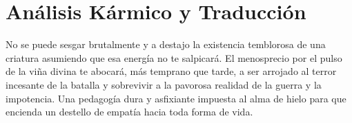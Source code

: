 \section{Análisis Kármico y Traducción}
\begin{figure}
  \vspace{-1.5em}
  \begin{center}
  \end{center}
  \vspace{-1.5em}
\end{figure}
No se puede sesgar brutalmente y a destajo la existencia temblorosa de una criatura asumiendo que esa energía no te salpicará. El menosprecio por el pulso de la viña divina te abocará, más temprano que tarde, a ser arrojado al terror incesante de la batalla y sobrevivir a la pavorosa realidad de la guerra y la impotencia. Una pedagogía dura y asfixiante impuesta al alma de hielo para que encienda un destello de empatía hacia toda forma de vida.

